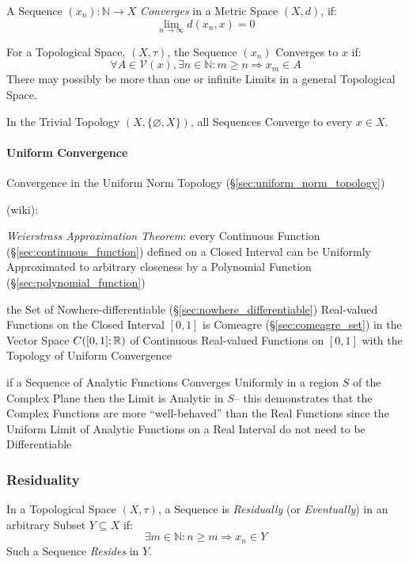 A Sequence $(x_n) : \mathbb{N} \rightarrow X$ \emph{Converges} in a Metric
Space $(X,d)$, if:
\[
  \lim_{n \rightarrow \infty} d (x_n, x) = 0
\]

For a Topological Space, $(X,\tau)$, the Sequence $(x_n)$ Converges to
$x$ if:
\[
  \forall A \in \mathcal{V}(x), \exists n \in \mathbb{N}
  : m \geq n \Rightarrow x_m \in A
\]
There may possibly be more than one or infinite Limits in a general
Topological Space.

In the Trivial Topology $(X, \{\varnothing, X\})$, all Sequences
Converge to every $x \in X$.



\paragraph{Uniform Convergence}\label{sec:uniform_convergence}\hfill

Convergence in the Uniform Norm Topology (\S\ref{sec:uniform_norm_topology})

(wiki):

\emph{Weierstrass Approximation Theorem}: every Continuous Function
(\S\ref{sec:continuous_function}) defined on a Closed Interval can be Uniformly
Approximated to arbitrary closeness by a Polynomial Function
(\S\ref{sec:polynomial_function})

the Set of Nowhere-differentiable (\S\ref{sec:nowhere_differentiable})
Real-valued Functions on the Closed Interval $[0,1]$ is Comeagre
(\S\ref{sec:comeagre_set}) in the Vector Space $C([0,1]; \mathbb{R})$ of Continuous
Real-valued Functions on $[0,1]$ with the Topology of Uniform Convergence

if a Sequence of Analytic Functions Converges Uniformly in a region $S$ of the
Complex Plane then the Limit is Analytic in $S$-- this demonstrates that the
Complex Functions are more ``well-behaved'' than the Real Functions since the
Uniform Limit of Analytic Functions on a Real Interval do not need to be
Differentiable



\subsubsection{Residuality}\label{sec:reside}

In a Topological Space $(X, \tau)$, a Sequence is \emph{Residually}
(or \emph{Eventually}) in an arbitrary Subset $Y \subseteq X$ if:
\[
  \exists m \in \mathbb{N} : n \geq m \Rightarrow x_n \in Y
\]
Such a Sequence \emph{Resides} in $Y$.



